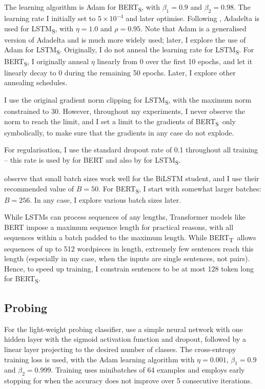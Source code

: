 \documentclass[bsc,frontabs,twoside,singlespacing,parskip,deptreport]{infthesis}
\def\BERTT{BERT\textsubscript{T}}
\def\BERTS{BERT\textsubscript{S}}
\def\LSTMS{LSTM\textsubscript{S}}
\begin{document}
{{{      The learning algorithm is Adam for \BERTS, with $\beta_1=0.9$ and $\beta_2=0.98$. The learning rate I initially set to $5\times10^{-4}$ and later optimise.
      Following \citeauthor{Tang_2019b}, Adadelta \citep{Zeiler_2012} is used for \LSTMS, with $\eta=1.0$ and $\rho=0.95$.
      Note that Adam is a generalised version of Adadelta and is much more widely used; later, I explore the use of Adam for \LSTMS. Originally, I do not anneal the learning rate for \LSTMS. For \BERTS, I originally anneal $\eta$ linearly from 0 over the first 10 epochs, and let it linearly decay to 0 during the remaining 50 epochs. Later, I explore other annealing schedules.

      I use the original gradient norm clipping for \LSTMS, with the maximum norm constrained to 30. However, throughout my experiments, I never observe the norm to reach the limit, and I set a limit to the gradients of \BERTS~only symbolically, to make sure that the gradients in any case do not explode.

      For regularisation, I use the standard dropout rate of 0.1 throughout all training -- this rate is used by \citet{Devlin_2018} for BERT and also by \citeauthor{Tang_2019b} for \LSTMS.

      \citeauthor{Tang_2019b} observe that small batch sizes work well for the BiLSTM student, and I use their recommended value of $B=50$. For \BERTS, I start with somewhat larger batches: $B=256$. In any case, I explore various batch sizes later.

      While LSTMs can process sequences of any lengths, Transformer models like BERT impose a maximum sequence length for practical reasons, with all sequences within a batch padded to the maximum length. While \BERTT~allows sequences of up to 512 wordpieces in length, extremely few sentences reach this length (especially in my case, when the inputs are single sentences, not pairs). Hence, to speed up training, I constrain sentences to be at most 128 token long for \BERTS.
    }

    \subsection{Probing}{
      \label{sec:implementation-details-probing}
      For the light-weight probing classifier, \citet{Conneau_2018} use a simple neural network with one hidden layer with the sigmoid activation function and dropout, followed by a linear layer projecting to the desired number of classes. The cross-entropy training loss is used, with the Adam learning algorithm with $\eta=0.001$, $\beta_1=0.9$ and $\beta_2=0.999$. Training uses minibatches of 64 examples and employs early stopping for when the accuracy does not improve over 5 consecutive iterations.

}}}
\end{document}
